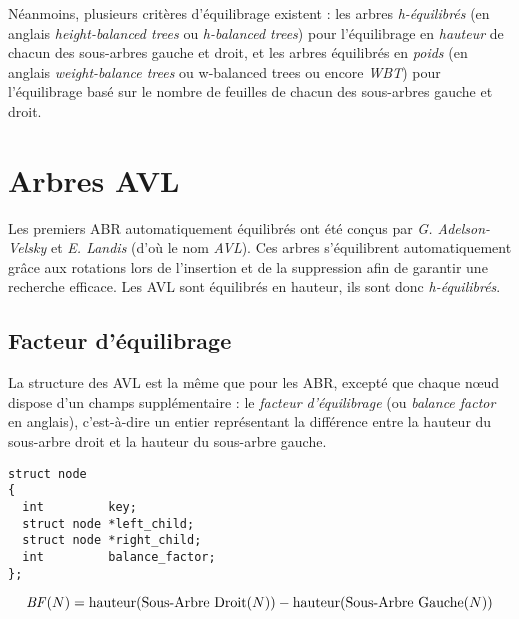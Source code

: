 \documentclass[11pt,a4paper,twoside]{article}
\begin{document}
Néanmoins, plusieurs critères d'équilibrage existent : les arbres \textit{h-équilibrés} (en anglais \textit{height-balanced trees} ou \textit{h-balanced trees}) pour l'équilibrage en \textit{hauteur} de chacun des sous-arbres gauche et droit, et les arbres équilibrés en \textit{poids} (en anglais \textit{weight-balance trees} ou {w-balanced trees} ou encore \textit{WBT}) pour l'équilibrage basé sur le nombre de feuilles de chacun des sous-arbres gauche et droit.


\clearpage


\section{Arbres AVL}

Les premiers ABR automatiquement équilibrés ont été conçus par \textit{G. Adelson-Velsky} et \textit{E. Landis} (d'où le nom \textit{AVL}).
Ces arbres s'équilibrent automatiquement grâce aux rotations lors de l'insertion et de la suppression afin de garantir une recherche efficace.
Les AVL sont équilibrés en hauteur, ils sont donc \textit{h-équilibrés}.


\subsection{Facteur d'équilibrage}

La structure des AVL est la même que pour les ABR, excepté que chaque nœud dispose d'un champs supplémentaire : le \textit{facteur d'équilibrage} (ou \textit{balance factor} en anglais), c'est-à-dire un entier représentant la différence entre la hauteur du sous-arbre droit et la hauteur du sous-arbre gauche.

\bigskip

\lstset{language=C}
\begin{lstlisting}[frame=single]
struct node
{
  int         key;
  struct node *left_child;
  struct node *right_child;
  int         balance_factor;
};
\end{lstlisting}

\vspace*{-0.5cm}

\begin{equation*}
\text{\textit{BF}}(N) = \text{hauteur}(\text{Sous-Arbre Droit}(N)) - \text{hauteur}(\text{Sous-Arbre Gauche}(N))
\end{equation*}
\end{document}
